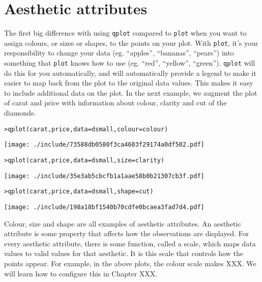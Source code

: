 \section{Aesthetic attributes}\label{sec:aesthetic_attributes}

The first big difference with using {\tt qplot} compared to {\tt plot} when you want to assign colours, or sizes or shapes, to the points on your plot.  With {\tt plot}, it's your responsibility to change your data (eg. ``apples'', ``bananas'', ``pears'') into something that {\tt plot} knows how to use (eg. ``red'', ``yellow'', ``green'').  {\tt qplot} will do this for you automatically, and will automatically provide a legend to make it easier to map back from the plot to the original data values.  This makes it easy to include additional data on the plot.  In the next example, we augment the plot of carat and price with information about colour, clarity and cut of the diamonds.

\begin{alltt}
> qplot(carat, price, data = dsmall, colour = colour)
\end{alltt}
\texttt{[image: ./include/73588db0580f3ca4603f29174a0df502.pdf]}
\begin{alltt}

> qplot(carat, price, data = dsmall, size = clarity)
\end{alltt}
\texttt{[image: ./include/35e3ab5cbcfb1a1aae58b0b21307cb3f.pdf]}
\begin{alltt}

> qplot(carat, price, data = dsmall, shape = cut)
\end{alltt}
\texttt{[image: ./include/198a18bf1540b70cdfe0bcaea3fad7d4.pdf]}
\begin{alltt}

\end{alltt}

Colour, size and shape are all examples of aesthetic attributes.  An aesthetic attribute is some property that affects how the observations are displayed.  For every aesthetic attribute, there is some function, called a scale, which maps data values to valid values for that aesthetic.  It is this scale that controls how the points appear.  For example, in the above plots, the colour scale makes XXX.  We will learn how to configure this in Chapter XXX.

